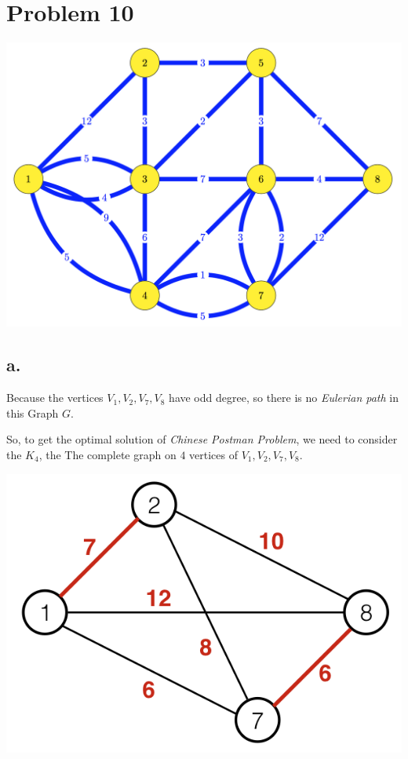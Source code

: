 \documentclass{article}
\begin{document}
\section*{Problem 10}{
    \begin{center}{
        \includegraphics[scale=0.4]{P10.png}
    }
    \end{center}
    \subsection*{a.}{
        Because the vertices \(\mathit{V}_{\mathrm{1}}, \mathit{V}_{\mathrm{2}}, \mathit{V}_{\mathrm{7}}, \mathit{V}_{\mathrm{8}}\) have odd degree, so there is no \textit{Eulerian path} in this Graph \(\mathit{G}\). 

        So, to get the optimal solution of \textit{Chinese Postman Problem}, we need to consider the \(\mathit{K}_{\mathrm{4}}\), the The complete graph on \(\mathrm{4}\) vertices of \(\mathit{V}_{\mathrm{1}}, \mathit{V}_{\mathrm{2}}, \mathit{V}_{\mathrm{7}}, \mathit{V}_{\mathrm{8}}\).

        \begin{center}{
            \includegraphics[scale=0.6]{P10_1.png}
        }
        \end{center}

}}
\end{document}
